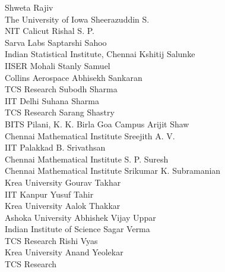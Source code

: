 \documentclass[a4paper,UKenglish]{dagrep-v2021}
\begin{document}
\begin{participants}
\participant Shweta Rajiv\\ The University of Iowa
\participant Sheerazuddin S.\\ NIT Calicut
\participant Rishal S. P.\\ Sarva Labs
\participant Saptarshi Sahoo\\ Indian Statistical Institute, Chennai
\participant Kshitij Salunke\\ IISER Mohali
\participant Stanly Samuel\\ Collins Aerospace
\participant Abhisekh Sankaran\\ TCS Research
\participant Subodh Sharma\\ IIT Delhi
\participant Suhana Sharma\\ TCS Research
\participant Sarang Shastry\\ BITS Pilani, K. K. Birla Goa Campus
\participant Arijit Shaw\\ Chennai Mathematical Institute
\participant Sreejith A. V.\\ IIT Palakkad
\participant B. Srivathsan\\ Chennai Mathematical Institute
\participant S. P. Suresh\\ Chennai Mathematical Institute
\participant Srikumar K. Subramanian\\ Krea University
\participant Gourav Takhar\\ IIT Kanpur
\participant Yusuf Tahir\\ Krea University
\participant Aalok Thakkar\\ Ashoka University
\participant Abhishek Vijay Uppar\\ Indian Institute of Science
\participant Sagar Verma\\ TCS Research
\participant Rishi Vyas\\ Krea University
\participant Anand Yeolekar\\ TCS Research
\end{participants}
\end{document}
